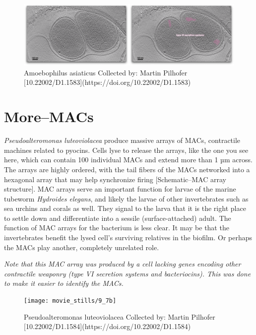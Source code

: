 \documentclass[]{tufte-book}
\begin{document}
\begin{figure}
\includegraphics{movie_stills/9_7a} \caption[Amoebophilus asiaticus Collected by]{Amoebophilus asiaticus Collected by: Martin Pilhofer [10.22002/D1.1583](https://doi.org/10.22002/D1.1583)}\label{fig:unnamed-chunk-165}
\end{figure}

\hypertarget{moremacs}{\section{More--MACs}\label{moremacs}}

\emph{Pseudoalteromonas luteoviolacea} produce massive arrays of MACs,
contractile machines related to pyocins. Cells lyse to release the
arrays, like the one you see here, which can contain 100 individual MACs
and extend more than 1 µm across. The arrays are highly ordered, with
the tail fibers of the MACs networked into a hexagonal array that may
help synchronize firing {[}Schematic--MAC array structure{]}. MAC arrays
serve an important function for larvae of the marine tubeworm
\emph{Hydroides elegans}, and likely the larvae of other invertebrates
such as sea urchins and corals as well. They signal to the larva that it
is the right place to settle down and differentiate into a sessile
(surface-attached) adult. The function of MAC arrays for the bacterium
is less clear. It may be that the invertebrates benefit the lysed cell's
surviving relatives in the biofilm. Or perhaps the MACs play another,
completely unrelated role.

\emph{Note that this MAC array was produced by a cell lacking genes
encoding other contractile weaponry (type VI secretion systems and
bacteriocins). This was done to make it easier to identify the MACs.}

\begin{figure}
\texttt{[image: movie\_stills/9\_7b]} \caption[Pseudoalteromonas luteoviolacea Collected by]{Pseudoalteromonas luteoviolacea Collected by: Martin Pilhofer [10.22002/D1.1584](https://doi.org/10.22002/D1.1584)}\label{fig:unnamed-chunk-166}
\end{figure}
\end{document}

